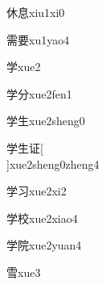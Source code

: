 \begin{verbete}[6;10]{休息}{xiu1xi0}
\end{verbete}

\begin{verbete}[14;9]{需要}{xu1yao4}
\end{verbete}

\begin{verbete}[8]{学}{xue2}
\end{verbete}

\begin{verbete}[8;4]{学分}{xue2fen1}
\end{verbete}

\begin{verbete}[8;5]{学生}{xue2sheng0}
\end{verbete}

\begin{verbete}[8;5;7]{学生证}[\\]{xue2sheng0zheng4}
\end{verbete}

\begin{verbete}[8;3]{学习}{xue2xi2}
\end{verbete}

\begin{verbete}[8;10]{学校}{xue2xiao4}
\end{verbete}

\begin{verbete}[8;9]{学院}{xue2yuan4}
\end{verbete}

\begin{verbete}[11]{雪}{xue3}
\end{verbete}

